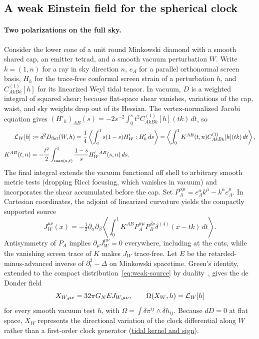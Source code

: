 \documentclass[10pt,a4paper]{article}
\numberwithin{equation}{section}
\newcommand{\repo}[2]{\href{https://github.com/sprajs/quantum-gravity/blob/main/#1}{#2}}
\begin{document}
\subsection{A weak Einstein field for the spherical clock}
\label{sec:weak}
\paragraph{Two polarizations on the full sky.}
Consider the lower cone of a unit round Minkowski diamond with a smooth shared cap, an emitter tetrad, and a smooth vacuum perturbation $W$. Write $k=(1,n)$ for a ray in sky direction $n$, $e_A$ for a parallel orthonormal screen basis, $H_h$ for the trace-free conformal screen strain of a perturbation $h$, and $C^{(1)}_{AkBk}[h]$ for its linearized Weyl tidal tensor. In vacuum, $D$ is a weighted integral of squared shear; because flat-space shear vanishes, variations of the cap, waist, and sky weights drop out of its Hessian. The vertex-normalized Jacobi equation gives $(H'_h)_{AB}(s)=-2s^{-2}\int_0^s t^2 C^{(1)}_{AkBk}[h](tk)\,dt$, so
\begin{align}
 {\cal L}_W[h] &:= d^2D_{\rm flat}(W,h)
 =\frac14\left\langle\int_a^1 s(1-s)H'_W:H'_h\,ds\right\rangle
 =\left\langle\int_0^1 K^{AB}(t,n)C^{(1)}_{AkBk}[h](tk)\,dt\right\rangle ,\nonumber\\
 K^{AB}(t,n)&=-\frac{t^2}{2}\int_{\max(a,t)}^1
                 \frac{1-s}{s}H'_W{}^{AB}(s,n)\,ds .
 \label{eq:weak-tidal}
\end{align}
The final integral extends the vacuum functional off shell to arbitrary smooth metric tests (dropping Ricci focusing, which vanishes in vacuum) and incorporates the shear accumulated before the cap. Set $P_A^{\alpha\mu}=e_A^\alpha k^\mu-k^\alpha e_A^\mu$. In Cartesian coordinates, the adjoint of linearized curvature yields the compactly supported source
\begin{equation}
 J_W^{\mu\nu}(x)=-\tfrac12\partial_\alpha\partial_\beta
 \left\langle\int_0^1 K^{AB}P_A^{\alpha\mu}P_B^{\beta\nu}
                     \delta^{(4)}(x-tk)\,dt\right\rangle .
 \label{eq:weak-source}
\end{equation}
Antisymmetry of $P_A$ implies $\partial_\mu J_W^{\mu\nu}=0$ everywhere, including at the cuts, while the vanishing screen trace of $K$ makes $J_W$ trace-free. Let $E$ be the retarded-minus-advanced inverse of $\partial_t^2-\Delta$ on Minkowski spacetime. Green's identity, extended to the compact distribution~\eqref{eq:weak-source} by duality~\cite{FewsterHunt2013,Baer2015}, gives the de Donder field
\begin{equation}
 X_{W,\mu\nu}=32\pi G_N E J_{W,\mu\nu},\qquad
 \Omega(X_W,h)={\cal L}_W[h]
 \label{eq:weak-field}
\end{equation}
for every smooth vacuum test $h$, with $\Omega=\int\delta\pi^{ij}\wedge\delta h_{ij}$. Because $dD=0$ at flat space, $X_W$ represents the directional variation of the clock differential along $W$ rather than a first-order clock generator (\repo{audit/weak-tidal.md}{tidal kernel and sign}).
\end{document}
